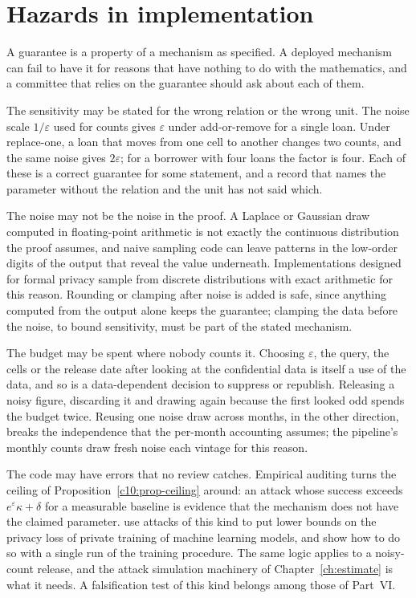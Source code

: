 \section{Hazards in implementation}

A guarantee is a property of a mechanism as specified. A deployed mechanism can
fail to have it for reasons that have nothing to do with the mathematics, and a
committee that relies on the guarantee should ask about each of them.

The sensitivity may be stated for the wrong relation or the wrong unit. The noise
scale $1/\varepsilon$ used for counts gives $\varepsilon$ under add-or-remove for a
single loan. Under replace-one, a loan that moves from one cell to another changes
two counts, and the same noise gives $2\varepsilon$; for a borrower with four loans
the factor is four. Each of these is a correct guarantee for some statement, and a
record that names the parameter without the relation and the unit has not said
which.

The noise may not be the noise in the proof. A Laplace or Gaussian draw computed in
floating-point arithmetic is not exactly the continuous distribution the proof
assumes, and naive sampling code can leave patterns in the low-order digits of the
output that reveal the value underneath. Implementations designed for formal
privacy sample from discrete distributions with exact arithmetic for this reason.
Rounding or clamping after noise is added is safe, since anything computed from
the output alone keeps the guarantee; clamping the data before the noise, to bound
sensitivity, must be part of the stated mechanism.

The budget may be spent where nobody counts it. Choosing $\varepsilon$, the
query, the cells or the release date after looking at the confidential data is
itself a use of the data, and so is a data-dependent decision to suppress or
republish. Releasing a noisy figure, discarding it and drawing again because the
first looked odd spends the budget twice. Reusing one noise draw across months,
in the other direction, breaks the independence that the per-month accounting
assumes; the pipeline's monthly counts draw fresh noise each vintage for this
reason.

The code may have errors that no review catches. Empirical auditing turns the
ceiling of Proposition~\ref{c10:prop-ceiling} around: an attack whose success
exceeds $e^\varepsilon\kappa + \delta$ for a measurable baseline is evidence that
the mechanism does not have the claimed parameter. \citet{jagielski2020} use
attacks of this kind to put lower bounds on the privacy loss of private training
of machine learning models, and \citet{steinke2023} show how to do so with a single
run of the training procedure. The same logic applies to a noisy-count release,
and the attack simulation machinery of Chapter~\ref{ch:estimate} is what it needs.
A falsification test of this kind belongs among those of Part~VI.

